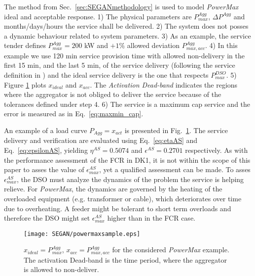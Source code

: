 The method from Sec.~\ref{sec:SEGANmethodology} is used to model \textit{PowerMax} ideal and acceptable response. 1) The physical parameters are $P_{max}^{Agg}$, $\Delta P^{Agg}$ and months/days/hours the service shall be delivered. 2) The system does not posses a dynamic behaviour related to system parameters. 3) As an example, the service tender defines $P_{max}^{Agg} = 200$ kW and $+1\%$ allowed deviation $P_{max,acc}^{Agg}$. 4) In this example we use 120 min service provision time with allowed non-delivery in the first 15 min, and the last 5 min, of the service delivery (following the service definition in \cite{ding2013development}) and the ideal service delivery is the one that respects $P_{max}^{DSO}$. 5) Figure \ref{fig:PowerMaxSim} plots $x_{ideal}$ and $x_{acc}$. The \textit{Activation Dead-band} indicates the regions where the aggregator is not obliged to deliver the service because of the tolerances defined under step 4. 6) The service is a maximum cap service and the error is measured as in Eq.~\eqref{eq:maxmin_cap}.

An example of a load curve $P_{Agg}=x_{act}$ is presented in Fig.~\ref{fig:PowerMaxSim}. The service delivery and verification are evaluated using Eq.~\eqref{eq:etaAS} and Eq.~\eqref{eq:epsilonAS}, yielding $\eta^{AS} = 0.5074$ and $\epsilon^{AS} = 0.2701$ respectively. As with the performance assessment of the FCR in DK1, it is not within the scope of this paper to asses the value of $\epsilon^{AS}_{max}$, yet a qualified assessment can be made. %
To asses $\epsilon^{AS}_{max}$, the DSO must analyze the dynamics of the problem the service is helping relieve. For \textit{PowerMax}, the dynamics are governed by the heating of the overloaded equipment (e.g. transformer or cable), which deteriorates over time due to overheating. A feeder might be tolerant to short term overloads and therefore the DSO might set $\epsilon^{AS}_{max}$ higher than in the FCR case.

\begin{figure}
\centering
\texttt{[image: SEGAN/powermaxsample.eps]}
\vspace{-4pt}
\caption{$x_{ideal}=P_{max}^{Agg}$, $x_{acc}=P_{max,acc}^{Agg}$ for the considered \textit{PowerMax} example. The activation Dead-band is the time period, where the aggregator is allowed to non-deliver.}\label{fig:PowerMaxSim}
\end{figure}

